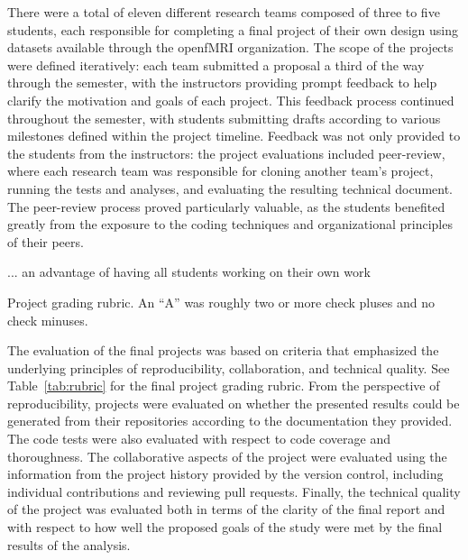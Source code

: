 There were a total of eleven different research teams composed of three
to five students, each responsible for completing a final project of their
own design using datasets available through the openfMRI organization.
The scope of the projects were defined iteratively: each team submitted a 
proposal a third of the way through the semester, with the instructors providing
prompt feedback to help clarify the motivation and goals of each project.
This feedback process continued throughout the semester, with students 
submitting drafts according to various milestones defined within the project
timeline.
Feedback was not only provided to the students from the instructors: the
project evaluations included peer-review, where each research team was
responsible for cloning another team's project, running the tests and analyses,
and evaluating the resulting technical document.
The peer-review process proved particularly valuable, as the students 
benefited greatly from the exposure to the coding techniques and 
organizational principles of their peers.

... an advantage of having all students working on their own work

\begin{table}
\centering
\begin{tiny}

\caption{Project grading rubric.
An ``A'' was roughly two or more check pluses and no check minuses.}
\label{tab:rubric}
\end{tiny}
\end{table}

The evaluation of the final projects was based on criteria that emphasized the
underlying principles of reproducibility, collaboration, and technical
quality.
See Table~\ref{tab:rubric} for the final project grading rubric.
From the perspective of reproducibility, projects were evaluated on whether the
presented results could be generated from their repositories according to the
documentation they provided.
The code tests were also evaluated with respect to code coverage
and thoroughness.
The collaborative aspects of the project were evaluated using the information
from the project history provided by the version control, including
individual contributions and reviewing pull requests.
Finally, the technical quality of the project was evaluated both in terms of
the clarity of the final report and with respect to how well the proposed
goals of the study were met by the final results of the analysis.

